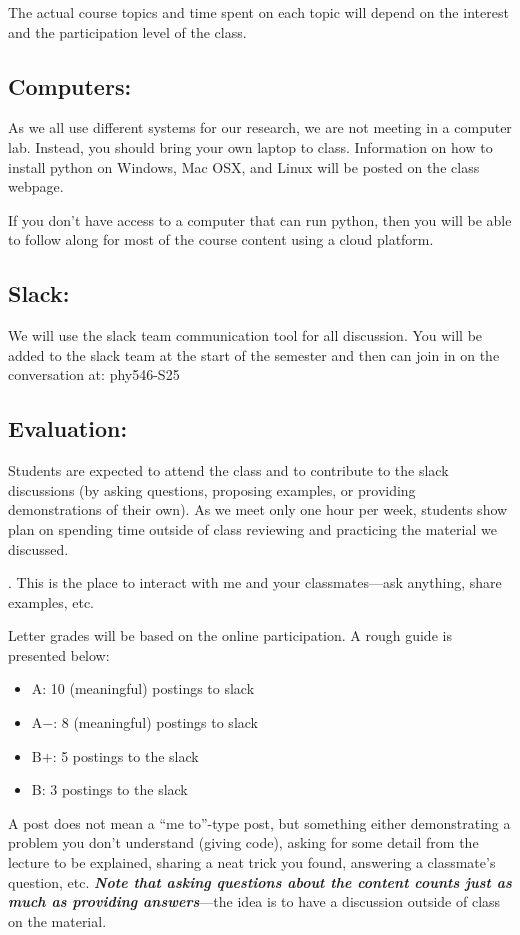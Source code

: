\documentclass[10pt]{article}
\begin{document}
\noindent The actual course topics and time spent on each topic will depend on the
interest and the participation level of the class.


\subsection*{Computers:}
%
As we all use different systems for our research, we are not meeting
in a computer lab.  Instead, you should bring your own laptop to
class.  Information on how to install python on Windows, Mac OSX, and
Linux will be posted on the class webpage.

\noindent
If you don't have access to a computer that can run python, then you will be
able to follow along for most of the course content using a cloud platform.


\subsection*{Slack:}
%
We will use the slack team communication tool for all discussion.  You
will be added to the slack team at the start of the semester and then
can join in on the conversation at: {\sf phy546-S25}


\subsection*{Evaluation:}

Students are expected to attend the class and to contribute
to the slack discussions (by asking questions, proposing examples, or
providing demonstrations of their own).  As we meet only one hour per
week, students show plan on spending time outside of class reviewing
and practicing the material we discussed.

.  This is the place to interact with
me and your classmates---ask anything, share examples, etc.

\noindent Letter grades will be based on the online participation.  A
rough guide is presented below:
\begin{itemize}
\item {\sf A\phantom{+}}: 10 (meaningful) postings to slack

\item {\sf A$-$}: 8 (meaningful) postings to slack

\item {\sf B$+$}: 5 postings to the slack

\item {\sf B\phantom{+}}:  3 postings to the slack
\end{itemize}
A post does not mean a ``me to''-type post, but something either
demonstrating a problem you don't understand (giving code), asking for
some detail from the lecture to be explained, sharing a neat trick you
found, answering a classmate's question, etc.  {\em \bfseries Note that asking
questions about the content counts just as much as providing
answers}---the idea is to have a discussion outside of class on the
material.
\end{document}

